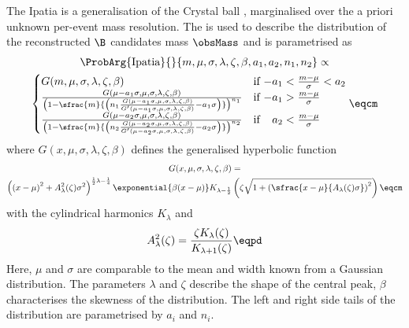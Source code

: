 The Ipatia \PDF \cite{Santos:2013gra} is a generalisation of the Crystal ball
\PDF \cite{set:crystalball}, marginalised over the a priori unknown per-event
mass resolution. The \PDF is used to describe the distribution of the
reconstructed $\B$ candidates mass $\obsMass$ and is parametrised as
%
\begin{multline}\label{eq:measurement_of_sin2beta:likelihood_fit:pdfs:ipatia}
  \ProbArg{\text{Ipatia}}{}{m, \mu, \sigma, \lambda, \zeta, \beta, a_1, a_2, n_1, n_2} \propto \\
    \begin{cases}
      G(m, \mu, \sigma, \lambda, \zeta, \beta)    & \text{if $-a_1 < \frac{m-\mu}{\sigma} < a_2$} \\
      \frac{G(\mu - a_1 \sigma, \mu, \sigma, \lambda, \zeta, \beta)}{
        \left( 1 - \sfrac{m}{\left( n_1 \frac{G(\mu - a_1 \sigma, \mu, \sigma, \lambda, \zeta, \beta)}{G^\prime(\mu - a_1 \sigma, \mu, \sigma, \lambda, \zeta, \beta)} - a_1 \sigma \right)} \right)^{n_1}
      }     & \text{if $-a_1 > \frac{m-\mu}{\sigma}$} \\
      \frac{G(\mu - a_2 \sigma, \mu, \sigma, \lambda, \zeta, \beta)}{
        \left( 1 - \sfrac{m}{\left( n_2 \frac{G(\mu - a_2 \sigma, \mu, \sigma, \lambda, \zeta, \beta)}{G^\prime(\mu - a_2 \sigma, \mu, \sigma, \lambda, \zeta, \beta)} - a_2 \sigma \right)} \right)^{n_2}
      }     & \text{if $\phantom{-}a_2 < \frac{m-\mu}{\sigma}$} \\
  \end{cases}\eqcm
\end{multline}
%
where $G(x, \mu, \sigma, \lambda, \zeta, \beta)$ defines the generalised hyperbolic function
\begin{multline}\label{eq:measurement_of_sin2beta:likelihood_fit:pdfs:generalised_hyperbolic}
  G(x, \mu, \sigma, \lambda, \zeta, \beta) = \\
  \left(\left(x - \mu\right)^2 + A_\lambda^2(\zeta) \sigma^2 \right)^{\frac{1}{2} \lambda - \frac{1}{4}}
  \exponential{\beta (x - \mu)} K_{\lambda-\frac{1}{2}}
  \left(\zeta \sqrt{1 + \left(\sfrac{x - \mu}{A_\lambda(\zeta) \sigma}\right)^2} \right)\eqcm
\end{multline}
%
with the cylindrical harmonics $K_\lambda$ and
%
\begin{equation}
  A_\lambda^2(\zeta) = \frac{\zeta K_\lambda(\zeta)}{K_{\lambda+1}(\zeta)}\eqpd
\end{equation}
%
Here, $\mu$ and $\sigma$ are comparable to the mean and width known from a
Gaussian distribution. The parameters $\lambda$ and $\zeta$ describe the shape
of the central peak, $\beta$ characterises the skewness of the distribution.
The left and right side tails of the distribution are parametrised by $a_i$ and
$n_i$.

